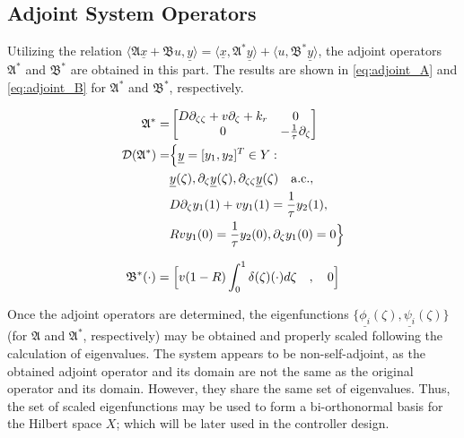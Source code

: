 
\appendix
\subsection{Adjoint System Operators} \label{app:adjoint}

Utilizing the relation $\langle \mathfrak{A} \underline{x} + \mathfrak{B} u, \underline{y}\rangle = \langle \underline{x}, \mathfrak{A}^* \underline{y}\rangle + \langle u, \mathfrak{B}^* \underline{y}\rangle$, the adjoint operators $\mathfrak{A}^*$ and $\mathfrak{B}^*$ are obtained in this part. The results are shown in \eqref{eq:adjoint_A} and \eqref{eq:adjoint_B} for $\mathfrak{A}^*$ and $\mathfrak{B}^*$, respectively.

\begin{equation} \label{eq:adjoint_A}
    \begin{aligned}
        {\mathfrak{A}}^{*} =&
        \begin{bmatrix}
            D \partial_{\zeta \zeta} + v \partial_\zeta +k_r & 0\\
            0 & -\frac{1}{\tau} \partial_\zeta
        \end{bmatrix}\\
        \mathcal{D}(\mathfrak{A}^*) =& \Bigl\{ \underline{y} = [y_1, y_2]^T \in Y:\\
        &\underline{y}(\zeta), \partial_\zeta \underline{y}(\zeta), \partial_{\zeta \zeta} \underline{y}(\zeta) \quad \mathrm{a.c.},\\
        &D \partial_\zeta y_1(1) + v y_1(1) = \frac{1}{\tau} y_2(1), \\
        &R v y_1(0) = \frac{1}{\tau} y_2(0), 
        \partial_\zeta y_1(0) = 0 \Bigr\}
    \end{aligned}
\end{equation}

\begin{equation} \label{eq:adjoint_B}
    \mathfrak{B}^* (\cdot) = \Bigl[ v(1-R) \int_0^1 \delta(\zeta) (\cdot) d\zeta \quad , \quad 0 \Bigr]
\end{equation}

Once the adjoint operators are determined, the eigenfunctions $\{ \underline{\phi_i}(\zeta), \underline{\psi_i}(\zeta) \}$ (for $\mathfrak{A}$ and $\mathfrak{A}^*$, respectively) may be obtained and properly scaled following the calculation of eigenvalues. The system appears to be non-self-adjoint, as the obtained adjoint operator and its domain are not the same as the original operator and its domain. However, they share the same set of eigenvalues. Thus, the set of scaled eigenfunctions may be used to form a bi-orthonormal basis for the Hilbert space $X$; which will be later used in the controller design. 

